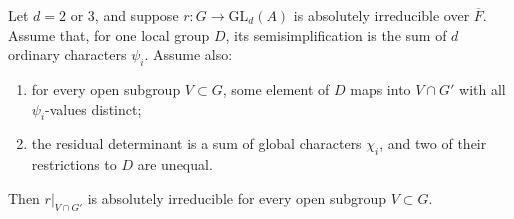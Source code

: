\begin{srproposition}
\label{prop:sr-curve-open-irreducibility}
Let \(d=2\) or \(3\), and suppose \(r:G\to\mathrm{GL}_d(A)\)
is absolutely irreducible over \(\overline F\).
Assume that, for one local group \(D\), its semisimplification
is the sum of \(d\) ordinary characters \(\psi_i\).
Assume also:
\begin{enumerate}
\item for every open subgroup \(V\subset G\), some element of
\(D\) maps into \(V\cap G'\) with all \(\psi_i\)-values distinct;
\item the residual determinant is a sum of global characters
\(\chi_i\), and two of their restrictions to \(D\) are unequal.
\end{enumerate}
Then \(r|_{V\cap G'}\) is absolutely irreducible for every
open subgroup \(V\subset G\).
\end{srproposition}
